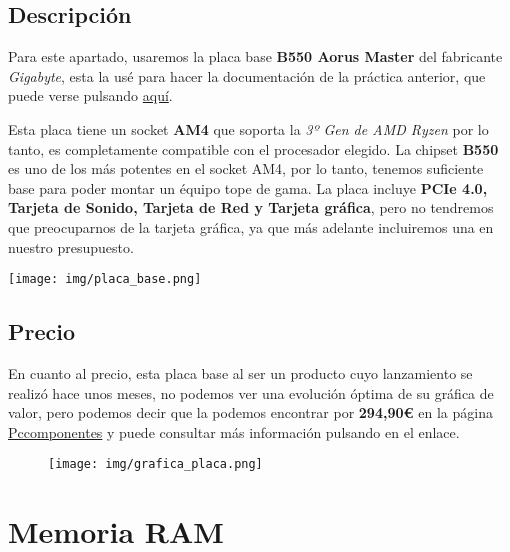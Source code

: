 \documentclass{article}
\begin{document}
      \subsection{Descripción}
        Para este apartado, usaremos la placa base \textbf{B550 Aorus Master} del fabricante \textit{Gigabyte}, esta la usé para hacer la documentación de la práctica anterior, que puede verse pulsando \href{https://github.com/ErTonix12/DAM/blob/main/1%C2%BA/SI/Placa_Base_Documentaci%C3%B3n/build/Placa_Base_Documentacion.pdf}{aquí}.
        \\
        \begin{minipage}{0.5\textwidth}
          Esta placa tiene un socket \textbf{AM4} que soporta la \textit{3º Gen de AMD Ryzen} por lo tanto, es completamente compatible con el procesador elegido. La chipset \textbf{B550} es uno de los más potentes en el socket AM4, por lo tanto, tenemos suficiente base para 
          poder montar un équipo tope de gama. La placa incluye \textbf{PCIe 4.0, Tarjeta de Sonido, Tarjeta de Red y Tarjeta gráfica}, pero no tendremos que preocuparnos de la tarjeta gráfica, ya que más adelante incluiremos una 
          en nuestro presupuesto.
        \end{minipage}
        \begin{minipage}{\textwidth}
          \texttt{[image: img/placa\_base.png]}
        \end{minipage}
      \subsection{Precio}
        En cuanto al precio, esta placa base al ser un producto cuyo lanzamiento se realizó hace unos meses, no podemos ver una evolución óptima de su gráfica de valor, pero podemos decir que la podemos encontrar por \textbf{294,90€} en la página 
        \href{https://www.pccomponentes.com/gigabyte-b550-aorus-master}{Pccomponentes} y puede consultar más información pulsando en el enlace.
        \\
        \begin{figure}[h]
          \centering
          \texttt{[image: img/grafica\_placa.png]}
        \end{figure}

  \newpage
    \section{Memoria RAM}
\end{document}

